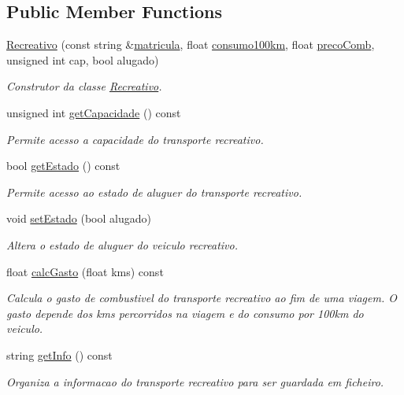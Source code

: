 \subsection*{Public Member Functions}
\begin{DoxyCompactItemize}
\item 
\mbox{\hyperlink{class_recreativo_aa931f6746a37e943b28387afed12ba34}{Recreativo}} (const string \&\mbox{\hyperlink{class_veiculo_ad9cd698bf39e90508cd0700ee3b9d90b}{matricula}}, float \mbox{\hyperlink{class_veiculo_a06533b15de432c2d6ee86057d35dc547}{consumo100km}}, float \mbox{\hyperlink{class_veiculo_a1b3f7e8c716e8fd68ec7c7405f18c1ef}{preco\+Comb}}, unsigned int cap, bool alugado)
\begin{DoxyCompactList}\small\item\em Construtor da classe \mbox{\hyperlink{class_recreativo}{Recreativo}}. \end{DoxyCompactList}\item 
unsigned int \mbox{\hyperlink{class_recreativo_ac03c531c9508b88ba3ebae98a906063e}{get\+Capacidade}} () const
\begin{DoxyCompactList}\small\item\em Permite acesso a capacidade do transporte recreativo. \end{DoxyCompactList}\item 
bool \mbox{\hyperlink{class_recreativo_a53798a5ad2a1b230927f29e6aa155272}{get\+Estado}} () const
\begin{DoxyCompactList}\small\item\em Permite acesso ao estado de aluguer do transporte recreativo. \end{DoxyCompactList}\item 
void \mbox{\hyperlink{class_recreativo_a43fca1861ff7f7f068fe303cb8f44d3d}{set\+Estado}} (bool alugado)
\begin{DoxyCompactList}\small\item\em Altera o estado de aluguer do veiculo recreativo. \end{DoxyCompactList}\item 
float \mbox{\hyperlink{class_recreativo_a83557bafb258efa9686ea2c2beb05442}{calc\+Gasto}} (float kms) const
\begin{DoxyCompactList}\small\item\em Calcula o gasto de combustivel do transporte recreativo ao fim de uma viagem. O gasto depende dos kms percorridos na viagem e do consumo por 100km do veiculo. \end{DoxyCompactList}\item 
string \mbox{\hyperlink{class_recreativo_a594c854bbcb834cff82c0687afa2b9ce}{get\+Info}} () const
\begin{DoxyCompactList}\small\item\em Organiza a informacao do transporte recreativo para ser guardada em ficheiro. \end{DoxyCompactList}\end{DoxyCompactItemize}
